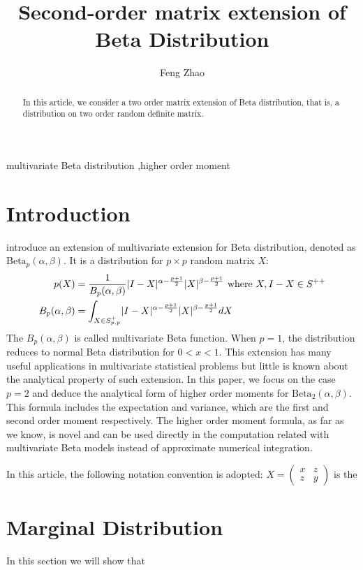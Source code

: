 \documentclass{elsarticle}
\title{Second-order matrix extension of Beta Distribution}
\author{Feng Zhao}
\DeclarePairedDelimiter\abs{\lvert}{\rvert}
\def\Beta{\textrm{Beta}}
\begin{document}
 \begin{abstract}
In this article, we consider a two order matrix extension of Beta distribution,
that is, a distribution on two order random definite matrix.
 \end{abstract}
\begin{keyword}
 multivariate Beta distribution \sep higher order moment
\end{keyword}
\maketitle
\section{Introduction}
\citet{olkin1964} introduce an extension of
multivariate extension for Beta distribution,
denoted as $\Beta_p(\alpha, \beta)$.
It is a distribution for $p\times p$ random matrix $X$:
\begin{align}
p(X) &= \frac{1}{B_p(\alpha, \beta)}\abs{I-X}^{\alpha-\frac{p+1}{2}}
\abs{X}^{\beta-\frac{p+1}{2}} \textrm{ where } X, I-X \in S^{++} \\
B_p(\alpha, \beta) &= \int_{X \in S_{p,p}^{+} }\abs{I-X}^{\alpha-\frac{p+1}{2}}
\abs{X}^{\beta-\frac{p+1}{2}}dX
\end{align}
The $B_p(\alpha, \beta)$ is called multivariate Beta function.
When $p=1$, the distribution reduces to normal Beta distribution for
$0<x<1$. This extension has many useful applications in multivariate statistical
problems but little is known about the analytical property of such extension.
In this paper, we focus on the case $p=2$ and deduce the analytical form of 
higher order moments for $\Beta_2(\alpha, \beta)$. This formula
includes the expectation and variance, which are the first and second
order moment respectively. The higher order moment formula, as
far as we know, is novel and can be used directly in the computation
related with multivariate Beta models instead of approximate
numerical integration.

In this article, the following notation convention is adopted:
$X=\begin{pmatrix} x & z \\ z & y \end{pmatrix}$ is the 
\section{Marginal Distribution}
In this section we will show that 


\end{document}
